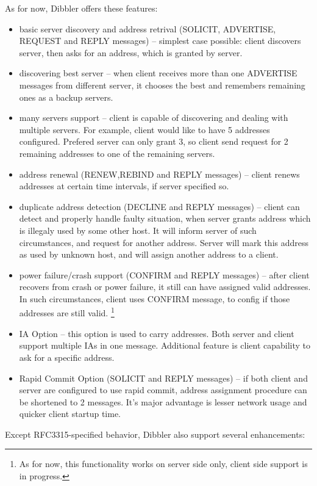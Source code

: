 As for now, Dibbler offers these features:
\begin{itemize}
\item basic server discovery and address retrival (SOLICIT,
  ADVERTISE, REQUEST and REPLY messages) -- simplest case possible:
  client discovers server, then asks for an address, which is granted
  by server.
\item discovering best server -- when client receives more than one
  ADVERTISE messages from different server, it chooses the best 
  and remembers remaining ones as a backup servers.
\item many servers support -- client is capable of discovering and
  dealing with multiple servers. For example, client would like to
  have 5 addresses configured. Prefered server can only grant 3, so
  client send request for 2 remaining addresses to one of the
  remaining servers.
\item address renewal (RENEW,REBIND and REPLY messages) -- client renews
  addresses at certain time intervals, if server specified so. 
\item duplicate address detection (DECLINE and REPLY messages) -- client
  can detect and properly handle faulty situation, when server grants
  address which is illegaly used by some other host. It will inform
  server of such circumstances, and request for another
  address. Server will mark this address as used by unknown host, and
  will assign another address to a client.
\item power failure/crash support (CONFIRM and REPLY messages) -- after
  client recovers from crash or power failure, it still can have
  assigned valid addresses. In such circumstances, client uses CONFIRM
  message, to config if those addresses are still valid. 
  \footnote{As for now, this functionality works on server side only,
  client side support is in progress.}
\item IA Option -- this option is used to carry addresses. Both server
  and client support multiple IAs in one message. Additional feature
  is client capability to ask for a specific address.
\item Rapid Commit Option (SOLICIT and REPLY messages) -- if both
  client and server are configured to use rapid commit, address
  assignment procedure can be shortened to 2 messages. It's major
  advantage is lesser network usage and quicker client startup time.
\end{itemize}

Except RFC3315-specified behavior, Dibbler also support several enhancements:

